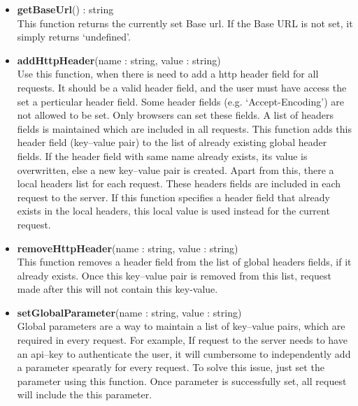\begin{itemize}
{}
\item{ \textbf{getBaseUrl}() : string \\
	This function returns the currently set Base url. If the Base URL is not set, it simply returns `undefined'.
}
\item{ \textbf{addHttpHeader}(name : string, value : string) \\
	Use this function, when there is need to add a http header field for all requests. It should be a valid header field, and the user must have access the set a perticular header field. Some header fields (e.g.  `Accept-Encoding') are not allowed to be set. Only browsers can set these fields. A list of headers fields is maintained which are included in all requests. This function adds this header field (key--value pair) to the list of already existing global header fields. If the header field with same name already exists, its value is overwritten, else a new key--value pair is created. Apart from this, there a local headers list for each request. These headers fields are included in each request to the server. If this function specifies a header field that already exists in the local headers, this local value is used instead for the current request.
}
\item{ \textbf{removeHttpHeader}(name : string, value : string) \\
	This function removes a header field from the list of global headers fields,  if it already exists. Once this key--value pair is removed from this list, request made after this will not contain this key-value.
}
\item{ \textbf{setGlobalParameter}(name : string, value : string) \\
	Global parameters are a way to maintain a list of key--value pairs, which are required in every request. For example, If request to the server needs to have an api--key to authenticate the user, it will cumbersome to independently add a parameter spearatly for every request. To solve this issue, just set the parameter using this function. Once parameter is successfully set, all request will include the this parameter. 
}

\end{itemize}

	








